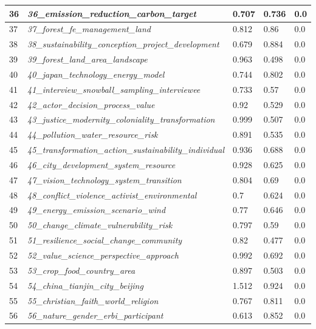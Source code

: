 \documentclass[12pt]{article}
\begin{document}
\begin{longtable}{|l|l|l|l|l|}
36 & \textit{36\_emission\_reduction\_carbon\_target} & 0.707 & 0.736 & 0.0 \\ \hline
37 & \textit{37\_forest\_fe\_management\_land} & 0.812 & 0.86 & 0.0 \\ \hline
38 & \textit{38\_sustainability\_conception\_project\_development} & 0.679 & 0.884 & 0.0 \\ \hline
39 & \textit{39\_forest\_land\_area\_landscape} & 0.963 & 0.498 & 0.0 \\ \hline
40 & \textit{40\_japan\_technology\_energy\_model} & 0.744 & 0.802 & 0.0 \\ \hline
41 & \textit{41\_interview\_snowball\_sampling\_interviewee} & 0.733 & 0.57 & 0.0 \\ \hline
42 & \textit{42\_actor\_decision\_process\_value} & 0.92 & 0.529 & 0.0 \\ \hline
43 & \textit{43\_justice\_modernity\_coloniality\_transformation} & 0.999 & 0.507 & 0.0 \\ \hline
44 & \textit{44\_pollution\_water\_resource\_risk} & 0.891 & 0.535 & 0.0 \\ \hline
45 & \textit{45\_transformation\_action\_sustainability\_individual} & 0.936 & 0.688 & 0.0 \\ \hline
46 & \textit{46\_city\_development\_system\_resource} & 0.928 & 0.625 & 0.0 \\ \hline
47 & \textit{47\_vision\_technology\_system\_transition} & 0.804 & 0.69 & 0.0 \\ \hline
48 & \textit{48\_conflict\_violence\_activist\_environmental} & 0.7 & 0.624 & 0.0 \\ \hline
49 & \textit{49\_energy\_emission\_scenario\_wind} & 0.77 & 0.646 & 0.0 \\ \hline
50 & \textit{50\_change\_climate\_vulnerability\_risk} & 0.797 & 0.59 & 0.0 \\ \hline
51 & \textit{51\_resilience\_social\_change\_community} & 0.82 & 0.477 & 0.0 \\ \hline
52 & \textit{52\_value\_science\_perspective\_approach} & 0.992 & 0.692 & 0.0 \\ \hline
53 & \textit{53\_crop\_food\_country\_area} & 0.897 & 0.503 & 0.0 \\ \hline
54 & \textit{54\_china\_tianjin\_city\_beijing} & 1.512 & 0.924 & 0.0 \\ \hline
55 & \textit{55\_christian\_faith\_world\_religion} & 0.767 & 0.811 & 0.0 \\ \hline
56 & \textit{56\_nature\_gender\_erbi\_participant} & 0.613 & 0.852 & 0.0 \\ \hline

\end{longtable}
\end{document}
